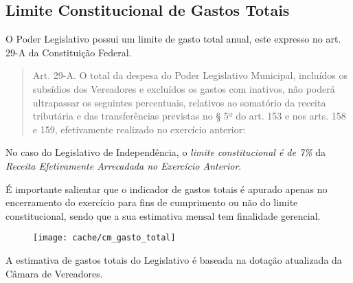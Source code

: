 
\subsection[Gastos Totais]{Limite Constitucional de Gastos Totais}

O Poder Legislativo possui um limite de gasto total anual, este expresso no art. 29-A da Constituição Federal.

\begin{quotation}
Art.  29-A.  O total da despesa do Poder Legislativo Municipal, incluídos os subsídios dos Vereadores e excluídos os gastos com inativos, não poderá ultrapassar os seguintes percentuais, relativos ao somatório da receita tributária e das transferências previstas no § 5º do art. 153 e nos arts. 158 e 159, efetivamente realizado no exercício anterior:
\end{quotation}

No caso do Legislativo de Independência, o \textit{limite constitucional é de 7\%} da \textit{Receita Efetivamente Arrecadada no Exercício Anterior}.



É importante salientar que o indicador de gastos totais é apurado apenas no encerramento do exercício para fins de cumprimento ou não do limite constitucional, sendo que a sua estimativa mensal tem finalidade gerencial.

\begin{figure}
\center
\texttt{[image: cache/cm\_gasto\_total]}
\end{figure}

A estimativa de gastos totais do Legislativo é baseada na dotação atualizada da Câmara de Vereadores.
